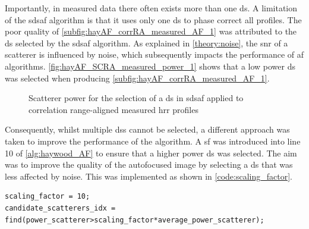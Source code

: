 \documentclass[class=report,11pt,crop=false]{standalone}
\begin{document}
    Importantly, in measured data there often exists more than one \gls{ds}. A limitation of the \gls{sdsaf} algorithm is that it uses only one \gls{ds} to phase correct all profiles. The poor quality of \autoref{subfig:hayAF_corrRA_measured_AF_1} was attributed to the \gls{ds} selected by the \gls{sdsaf} algorithm. As explained in \autoref{theory:noise}, the \gls{snr} of a scatterer is influenced by noise, which subsequently impacts the performance of \gls{af} algorithms. \autoref{fig:hayAF_SCRA_measured_power_1} shows that a low power \gls{ds} was selected when producing \autoref{subfig:hayAF_corrRA_measured_AF_1}. 
    \begin{figure}[H]
        \centering
        \resizebox{0.4\linewidth}{!}{}
        \caption{Scatterer power for the selection of a \gls{ds} in \gls{sdsaf} applied to correlation range-aligned measured \gls{hrr} profiles}
       \label{fig:hayAF_SCRA_measured_power_1}
    \end{figure}

    Consequently, whilst multiple \gls{ds}s cannot be selected, a different approach was taken to improve the performance of the algorithm. A \gls{sf} was introduced into line 10 of \autoref{alg:haywood_AF} to ensure that a higher power \gls{ds} was selected. The aim was to improve the quality of the autofocused image by selecting a \gls{ds} that was less affected by noise. This was implemented as shown in \autoref{code:scaling_factor}.
\begin{lstlisting}[caption={\textsc{MATLAB} code for scaling factor in candidate \gls{ds} selection.},label={code:scaling_factor}]
scaling_factor = 10;
candidate_scatterers_idx = find(power_scatterer>scaling_factor*average_power_scatterer);
\end{lstlisting}
\end{document}

